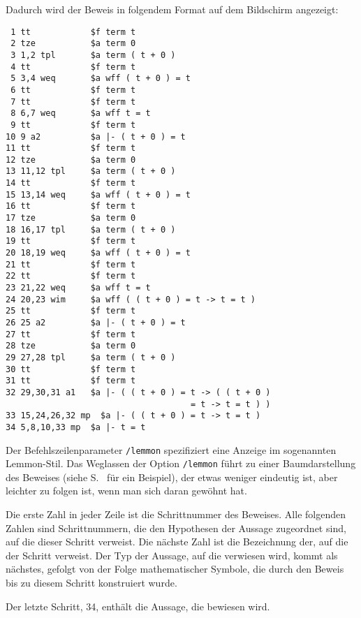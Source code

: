 Dadurch wird der Beweis in folgendem Format auf dem Bildschirm angezeigt:
\begin{verbatim}
 1 tt            $f term t
 2 tze           $a term 0
 3 1,2 tpl       $a term ( t + 0 )
 4 tt            $f term t
 5 3,4 weq       $a wff ( t + 0 ) = t
 6 tt            $f term t
 7 tt            $f term t
 8 6,7 weq       $a wff t = t
 9 tt            $f term t
10 9 a2          $a |- ( t + 0 ) = t
11 tt            $f term t
12 tze           $a term 0
13 11,12 tpl     $a term ( t + 0 )
14 tt            $f term t
15 13,14 weq     $a wff ( t + 0 ) = t
16 tt            $f term t
17 tze           $a term 0
18 16,17 tpl     $a term ( t + 0 )
19 tt            $f term t
20 18,19 weq     $a wff ( t + 0 ) = t
21 tt            $f term t
22 tt            $f term t
23 21,22 weq     $a wff t = t
24 20,23 wim     $a wff ( ( t + 0 ) = t -> t = t )
25 tt            $f term t
26 25 a2         $a |- ( t + 0 ) = t
27 tt            $f term t
28 tze           $a term 0
29 27,28 tpl     $a term ( t + 0 )
30 tt            $f term t
31 tt            $f term t
32 29,30,31 a1   $a |- ( ( t + 0 ) = t -> ( ( t + 0 )
                                     = t -> t = t ) )
33 15,24,26,32 mp  $a |- ( ( t + 0 ) = t -> t = t )
34 5,8,10,33 mp  $a |- t = t
\end{verbatim}

Der Befehlszeilenparameter \texttt{/lemmon} spezifiziert eine Anzeige im sogenannten Lemmon-Stil.  Das Weglassen der Option \texttt{/lemmon} führt zu einer Baumdarstellung des Beweises (siehe S.~\pageref{treeproof} für ein Beispiel), der etwas weniger eindeutig ist, aber leichter zu folgen ist, wenn man sich daran gewöhnt hat.

Die erste Zahl in jeder Zeile ist die Schrittnummer des Beweises.  Alle folgenden Zahlen sind Schrittnummern, die den Hypothesen der Aussage zugeordnet sind, auf die dieser Schritt verweist.  Die nächste Zahl ist die Bezeichnung der, auf die der Schritt verweist.  Der Typ der Aussage, auf die verwiesen wird, kommt als nächstes, gefolgt von der Folge mathematischer Symbole, die durch den Beweis bis zu diesem Schritt konstruiert wurde.

Der letzte Schritt, 34, enthält die Aussage, die bewiesen wird.


